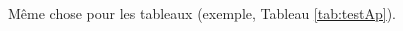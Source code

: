 \documentclass[letterpaper%
, twoside%
, 12pt%
,these%
,french
,creativecommons,hyperref,withAlgo2e%
]{thETS}
\begin{document}
Même chose pour les tableaux (exemple, Tableau \ref{tab:testAp}).



\newpage
\begin{spacing}{1}
	\nocite{*} %


\end{spacing}


\newpage
\begin{spacing}{1}


\end{spacing}
\end{document}
